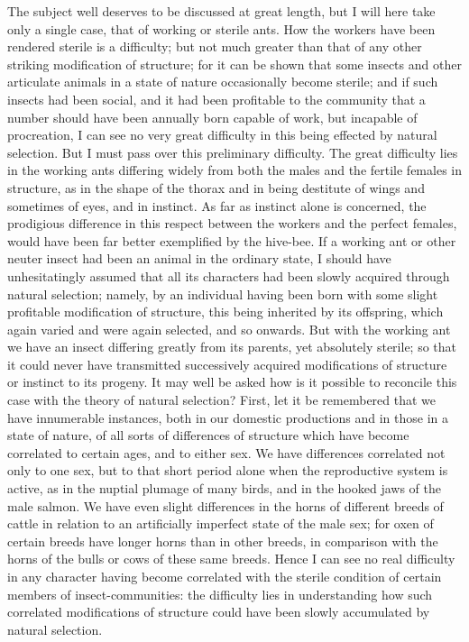 The subject well deserves to be discussed at great length, but I will here take only a single case, that of working or sterile ants. How the workers have been rendered sterile is a difficulty; but not much greater than that of any other striking modification of structure; for it can be shown that some insects and other articulate animals in a state of nature occasionally become sterile; and if such insects had been social, and it had been profitable to the community that a number should have been annually born capable of work, but incapable of procreation, I can see no very great difficulty in this being effected by natural selection. But I must pass over this preliminary difficulty. The great difficulty lies in the working ants differing widely from both the males and the fertile females in structure, as in the shape of the thorax and in being destitute of wings and sometimes of eyes, and in instinct. As far as instinct alone is concerned, the prodigious difference in this respect between the workers and the perfect females, would have been far better exemplified by the hive-bee. If a working ant or other neuter insect had been an animal in the ordinary state, I should have unhesitatingly assumed that all its characters had been slowly acquired through natural selection; namely, by an individual having been born with some slight profitable modification of structure, this being inherited by its offspring, which again varied and were again selected, and so onwards. But with the working ant we have an insect differing greatly from its parents, yet absolutely sterile; so that it could never have transmitted successively acquired modifications of structure or instinct to its progeny. It may well be asked how is it possible to reconcile this case with the theory of natural selection?
First, let it be remembered that we have innumerable instances, both in our domestic productions and in those in a state of nature, of all sorts of differences of structure which have become correlated to certain ages, and to either sex. We have differences correlated not only to one sex, but to that short period alone when the reproductive system is active, as in the nuptial plumage of many birds, and in the hooked jaws of the male salmon. We have even slight differences in the horns of different breeds of cattle in relation to an artificially imperfect state of the male sex; for oxen of certain breeds have longer horns than in other breeds, in comparison with the horns of the bulls or cows of these same breeds. Hence I can see no real difficulty in any character having become correlated with the sterile condition of certain members of insect-communities: the difficulty lies in understanding how such correlated modifications of structure could have been slowly accumulated by natural selection.
